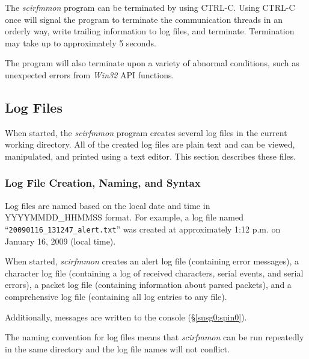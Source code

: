 \documentclass[letterpaper,10pt,titlepage]{article}
\newcommand{\productname}{scirfmmon}
\newcommand{\productnameemph}{\emph{\productname}}
\begin{document}
The \productnameemph{} program can be terminated by using CTRL-C.  Using 
CTRL-C once will signal the program to terminate the communication threads
in an orderly way, write trailing information to log files, and terminate.
Termination may take up to approximately 5 seconds.

The program will also terminate upon a variety of abnormal conditions,
such as unexpected errors from \emph{Win32} API functions.


\subsection{Log Files}
\label{susg0:slgf0}

When started, the \productnameemph{} program creates several log files in
the current working directory.  All of the created log files are 
plain text and can be viewed, manipulated, and printed
using a text editor.  This section describes these files.


\subsubsection{Log File Creation, Naming, and Syntax}
\label{susg0:slgf0:sfcn0}

Log files are named based on the local date and time in
YYYYMMDD\_HHMMSS format.   For example, a log file named
``\texttt{20090116\_131247\_alert.txt}'' was created at 
approximately 1:12 p.m. on January 16, 2009 (local time).

When started, \productnameemph{} creates an alert log file (containing error
messages), a character log file (containing a log of received characters,
serial events, and serial errors), a packet log file (containing 
information about parsed packets), and a comprehensive log file
(containing all log entries to any file).

Additionally, messages are written to the console (\S{}\ref{susg0:spin0}).

The naming convention for log files means that \productnameemph{}
can be run repeatedly in the same directory and the log file names will
not conflict.
\end{document}
